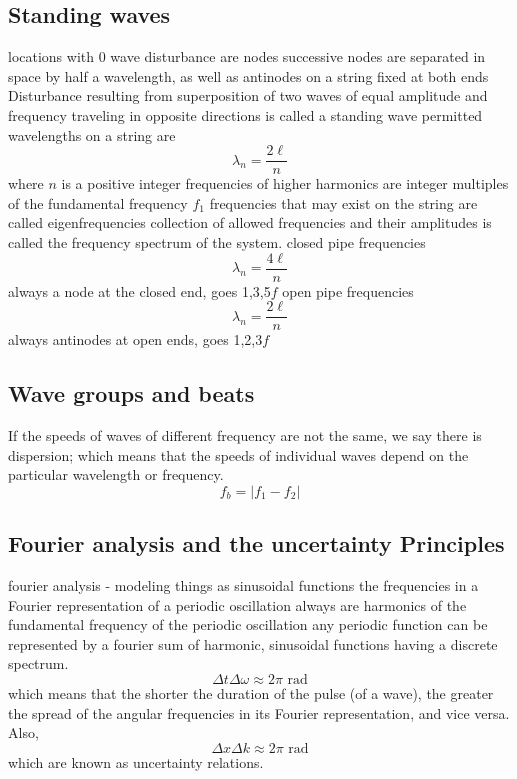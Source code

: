 \documentclass{article}
\begin{document}
\subsection{Standing waves}
\begin{outline}
\1 locations with 0 wave disturbance are nodes
\1 successive nodes are separated in space by half a wavelength, as well as antinodes on a string fixed at both ends
\1 Disturbance resulting from superposition of two waves of equal amplitude and frequency traveling in opposite directions is called a standing wave
\1 permitted wavelengths on a string are \[\lambda_n=\dfrac{2\ell}{n}\] where $n$ is a positive integer
\1 frequencies of higher harmonics are integer multiples of the fundamental frequency $f_1$
\1 frequencies that may exist on the string are called eigenfrequencies
\1 collection of allowed frequencies and their amplitudes is called the frequency spectrum of the system. 
\1 closed pipe frequencies \[\lambda_n=\dfrac{4\ell}{n}\] always a node at the closed end, goes 1,3,5$f$
\1 open pipe frequencies \[\lambda_n=\dfrac{2\ell}{n}\] always antinodes at open ends, goes 1,2,3$f$
\end{outline}
\subsection{Wave groups and beats}
\begin{outline}
\1 If the speeds of waves of different frequency are not the same, we say there is dispersion; which means that the speeds of individual waves depend on the particular wavelength or frequency. 
\0 \[f_b=|f_1-f_2|\]
\end{outline}
\subsection{Fourier analysis and the uncertainty Principles}
\begin{outline}
\1 fourier analysis - modeling things as sinusoidal functions
\1 the frequencies in a Fourier representation of a periodic oscillation always are harmonics of the fundamental frequency of the periodic oscillation
\1 any periodic function can be represented by a fourier sum of harmonic, sinusoidal functions having a discrete spectrum. 
\0 \[\Delta t\Delta\omega\approx2\pi\text{ rad}\]
\1 which means that the shorter the duration of the pulse (of a wave), the greater the spread of the angular frequencies in its Fourier representation, and vice versa. Also, \[\Delta x\Delta k\approx2\pi\text{ rad}\]
\1 which are known as uncertainty relations.
\end{outline}
\end{document}
